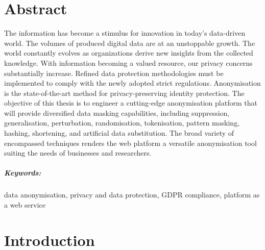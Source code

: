 \documentclass[a4paper,twoside,12pt]{book}
\newcounter{PagesWithoutNumbers}
\begin{document}
\cleardoublepage
 

\rmfamily
\normalfont



\pagestyle{onlyPageNumbers}
\tableofcontents

\setcounter{PagesWithoutNumbers}{\value{page}}
\mainmatter
\pagestyle{empty}

\chapter*{Abstract}



The information has become a stimulus for innovation in today's data-driven world. The volumes of produced digital data are at an unstoppable growth. The world constantly evolves as organizations derive new insights from the collected knowledge. With information becoming a valued resource, our privacy concerns substantially increase. Refined data protection methodologies must be implemented to comply with the newly adopted strict regulations. Anonymisation is the state-of-the-art method for privacy-preserving identity protection. The objective of this thesis is to engineer a cutting-edge anonymisation platform that will provide diversified data masking capabilities, including suppression, generalisation, perturbation, randomisation, tokenisation, pattern masking, hashing, shortening, and artificial data substitution. The broad variety of encompassed techniques renders the web platform a versatile anonymisation tool suiting the needs of businesses and researchers.

\paragraph{Keywords:} data anonymisation, privacy and data protection, GDPR compliance, platform as a web service

\cleardoublepage


\pagestyle{PageNumbersChapterTitles}



\chapter{Introduction}
\end{document}
